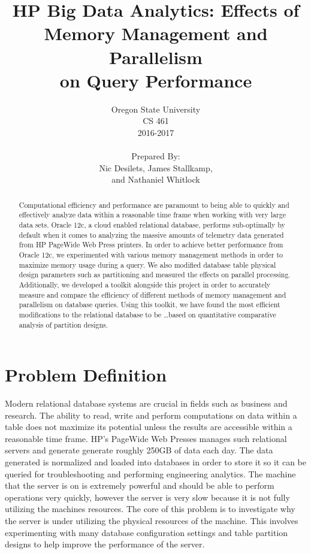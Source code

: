 \documentclass[draftclsnofoot, onecolumn, 10pt]{IEEEtran}
\title{\huge HP Big Data Analytics: Effects of\\Memory Management and Parallelism\\on Query Performance}
\author{Oregon State University\\CS 461\\2016-2017\\\\Prepared By:\\Nic Desilets, James Stallkamp,\\and Nathaniel Whitlock}
\begin{document}
\begin{titlingpage}
    \maketitle 
    \begin{abstract}
		\noindent Computational efficiency and performance are paramount to being able to quickly and effectively analyze data within a reasonable time frame when working with very large data sets. 
		Oracle 12c, a cloud enabled relational database, performs sub-optimally by default when it comes to analyzing the massive amounts of telemetry data generated from HP PageWide Web Press printers.
		In order to achieve better performance from Oracle 12c, we experimented with various memory management methods in order to maximize memory usage during a query.
		We also modified database table physical design parameters such as partitioning and measured the effects on parallel processing.
		Additionally, we developed a toolkit alongside this project in order to accurately measure and compare the efficiency of different methods of memory management and parallelism on database queries.
		Using this toolkit, we have found the most efficient modifications to the relational database to be \ldots based on quantitative comparative analysis of partition designs.
    \end{abstract}
\end{titlingpage}


\section*{Problem Definition}
Modern relational database systems are crucial in fields such as business and research.
The ability to read, write and perform computations on data within a table does not maximize its potential unless the results are accessible within a reasonable time frame.
HP’s PageWide Web Presses manages such relational servers and generate generate roughly 250GB of data each day.
The data generated is normalized and loaded into databases in order to store it so it can be queried for troubleshooting and performing engineering analytics.
The machine that the server is on is extremely powerful and should be able to perform operations very quickly, however the server is very slow because it is not fully utilizing the machines resources.
The core of this problem is to investigate why the server is under utilizing the physical resources of the machine.
This involves experimenting with many database configuration settings and table partition designs to help improve the performance of the server. 
\end{document}
